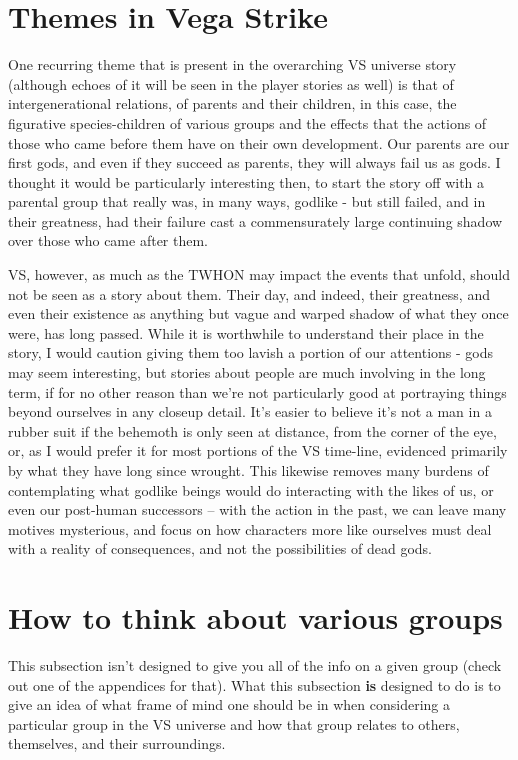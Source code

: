 \section{Themes in Vega Strike}
\label{sec:VSthemes}
One recurring theme that is present in the overarching VS universe
story (although echoes of it will be seen in the player stories as
well) is that of intergenerational relations, of parents and their
children, in this case, the figurative species-children of various
groups and the effects that the actions of those who came before them
have on their own development. Our parents are our first gods, and
even if they succeed as parents, they will always fail us as gods. I
thought it would be particularly interesting then, to start the story
off with a parental group that really was, in many ways, godlike - but
still failed, and in their greatness, had their failure cast a
commensurately large continuing shadow over those who came after them.

VS, however, as much as the TWHON may impact the events that unfold,
should not be seen as a story about them. Their day, and indeed, their
greatness, and even their existence as anything but vague and warped
shadow of what they once were, has long passed. While it is worthwhile
to understand their place in the story, I would caution giving them
too lavish a portion of our attentions - gods may seem interesting,
but stories about people are much involving in the long term, if for
no other reason than we're not particularly good at portraying things
beyond ourselves in any closeup detail. It's easier to believe it's
not a man in a rubber suit if the behemoth is only seen at distance,
from the corner of the eye, or, as I would prefer it for most portions
of the VS time-line, evidenced primarily by what they have long since
wrought. This likewise removes many burdens of contemplating what
godlike beings would do interacting with the likes of us, or even our
post-human successors -- with the action in the past, we can leave
many motives mysterious, and focus on how characters more like
ourselves must deal with a reality of consequences, and not the
possibilities of dead gods.

\section{How to think about various groups}
\label{sec:groupintuitions}
This subsection isn't designed to give you all of the info on a given
group (check out one of the appendices for that). What this subsection
{\bf is} designed to do is to give an idea of what frame of mind one
should be in when considering a particular group in the VS universe
and how that group relates to others, themselves, and their
surroundings.


